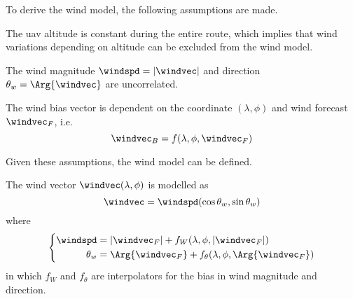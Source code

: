 To derive the wind model, the following assumptions are made.

\begin{assumption}
The \ac{uav} altitude is constant during the entire route, which implies that wind variations depending on altitude can be excluded from the wind model.
\end{assumption}

\begin{assumption}
The wind magnitude $\windspd=|\windvec|$ and direction $\theta_w=\Arg{\windvec}$ are uncorrelated.
\end{assumption}

\begin{assumption}
The wind bias vector is dependent on the coordinate $(\lambda,\phi)$ and wind forecast $\windvec_F$, i.e.
\begin{equation}
    \windvec_B=f(\lambda,\phi,\windvec_F)
\end{equation}
\end{assumption}

Given these assumptions, the wind model can be defined.

\begin{definition}
    The wind vector $\windvec(\lambda,\phi)$ is modelled as
    \begin{equation}
        \windvec=\windspd(\cos\theta_w,\sin\theta_w)
    \end{equation}
    where
    \begin{equation}
        \left\{
        \begin{aligned}
            \windspd &= |\windvec_F| + f_W(\lambda,\phi,|\windvec_F|) \\
            \theta_w &= \Arg{\windvec_F} + f_\theta(\lambda,\phi,\Arg{\windvec_F}) 
        \end{aligned}
        \right.
    \end{equation}
    in which $f_W$ and $f_\theta$ are \abbrTPS interpolators for the bias in wind magnitude and direction.
\end{definition}

